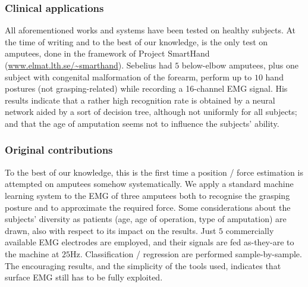 \subsubsection{Clinical applications}

All aforementioned works and systems have been tested on healthy subjects. At the time
of writing and to the best of our knowledge, \cite{sebelius} is the only test on amputees, done
in the framework of Project SmartHand (\url{www.elmat.lth.se/~smarthand}).
Sebelius had $5$ below-elbow amputees, plus one subject
with congenital malformation of the forearm, perform up to
$10$ hand postures (not grasping-related) while recording a 16-channel EMG signal. His
results indicate that a rather high recognition rate is obtained by a neural network
aided by a sort of decision tree, although not uniformly for all subjects; and that
the age of amputation seems not to influence the subjects' ability.

\subsubsection{Original contributions}

To the best of our knowledge, this is the first time a position / force estimation
is attempted on amputees somehow systematically. We apply a standard machine learning
system to the EMG of three amputees both to recognise the grasping posture and
to approximate the required force. Some considerations about the subjects' diversity
as patients (age, age of operation, type of amputation) are drawn, also with respect to
its impact on the results. Just $5$ commercially available EMG electrodes are
employed, and their signals are fed as-they-are to the machine at $25$Hz.
Classification / regression are performed sample-by-sample. The encouraging results,
and the simplicity of the tools used, indicates that surface EMG still has to be
fully exploited.
